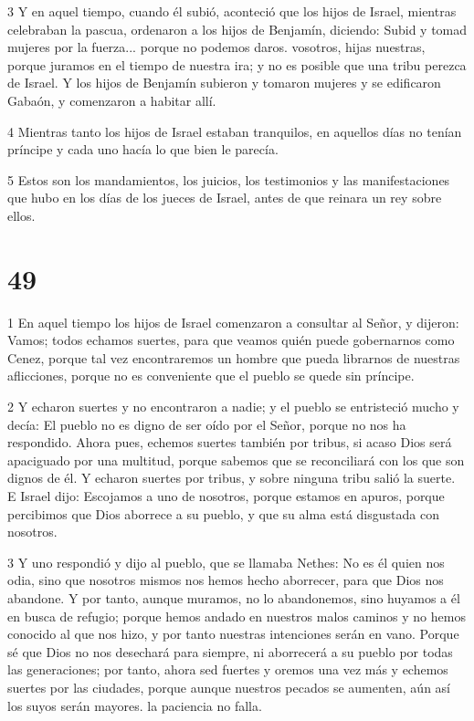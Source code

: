 \par 3 Y en aquel tiempo, cuando él subió, aconteció que los hijos de Israel, mientras celebraban la pascua, ordenaron a los hijos de Benjamín, diciendo: Subid y tomad mujeres por la fuerza... porque no podemos daros. vosotros, hijas nuestras, porque juramos en el tiempo de nuestra ira; y no es posible que una tribu perezca de Israel. Y los hijos de Benjamín subieron y tomaron mujeres y se edificaron Gabaón, y comenzaron a habitar allí.

\par 4 Mientras tanto los hijos de Israel estaban tranquilos, en aquellos días no tenían príncipe y cada uno hacía lo que bien le parecía.

\par 5 Estos son los mandamientos, los juicios, los testimonios y las manifestaciones que hubo en los días de los jueces de Israel, antes de que reinara un rey sobre ellos.

\chapter{49}

\par 1 En aquel tiempo los hijos de Israel comenzaron a consultar al Señor, y dijeron: Vamos; todos echamos suertes, para que veamos quién puede gobernarnos como Cenez, porque tal vez encontraremos un hombre que pueda librarnos de nuestras aflicciones, porque no es conveniente que el pueblo se quede sin príncipe.

\par 2 Y echaron suertes y no encontraron a nadie; y el pueblo se entristeció mucho y decía: El pueblo no es digno de ser oído por el Señor, porque no nos ha respondido. Ahora pues, echemos suertes también por tribus, si acaso Dios será apaciguado por una multitud, porque sabemos que se reconciliará con los que son dignos de él. Y echaron suertes por tribus, y sobre ninguna tribu salió la suerte. E Israel dijo: Escojamos a uno de nosotros, porque estamos en apuros, porque percibimos que Dios aborrece a su pueblo, y que su alma está disgustada con nosotros.

\par 3 Y uno respondió y dijo al pueblo, que se llamaba Nethes: No es él quien nos odia, sino que nosotros mismos nos hemos hecho aborrecer, para que Dios nos abandone. Y por tanto, aunque muramos, no lo abandonemos, sino huyamos a él en busca de refugio; porque hemos andado en nuestros malos caminos y no hemos conocido al que nos hizo, y por tanto nuestras intenciones serán en vano. Porque sé que Dios no nos desechará para siempre, ni aborrecerá a su pueblo por todas las generaciones; por tanto, ahora sed fuertes y oremos una vez más y echemos suertes por las ciudades, porque aunque nuestros pecados se aumenten, aún así los suyos serán mayores. la paciencia no falla.

